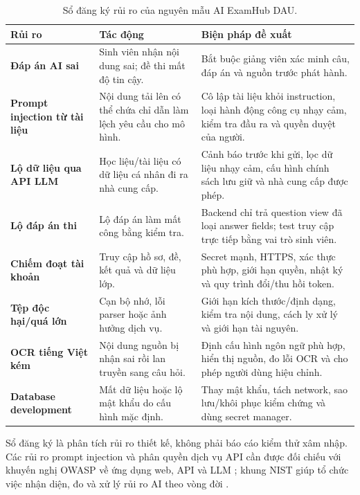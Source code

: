 \begin{table}[H]
\centering
\caption{Sổ đăng ký rủi ro của nguyên mẫu AI ExamHub DAU.}
\label{tab:risk-register}
\begin{tabularx}{\textwidth}{>{\bfseries\color{daumaroon}}p{}X X}
\toprule
\rowcolor{gray100}Rủi ro & Tác động & Biện pháp đề xuất \\
\midrule
Đáp án AI sai & Sinh viên nhận nội dung sai; đề thi mất độ tin cậy. & Bắt buộc giảng viên xác minh câu, đáp án và nguồn trước phát hành. \\
Prompt injection từ tài liệu & Nội dung tải lên có thể chứa chỉ dẫn làm lệch yêu cầu cho mô hình. & Cô lập tài liệu khỏi instruction, loại hành động công cụ nhạy cảm, kiểm tra đầu ra và quyền duyệt của người. \\
Lộ dữ liệu qua API LLM & Học liệu/tài liệu có dữ liệu cá nhân đi ra nhà cung cấp. & Cảnh báo trước khi gửi, lọc dữ liệu nhạy cảm, cấu hình chính sách lưu giữ và nhà cung cấp được phép. \\
Lộ đáp án thi & Lộ đáp án làm mất công bằng kiểm tra. & Backend chỉ trả question view đã loại answer fields; test truy cập trực tiếp bằng vai trò sinh viên. \\
Chiếm đoạt tài khoản & Truy cập hồ sơ, đề, kết quả và dữ liệu lớp. & Secret mạnh, HTTPS, xác thực phù hợp, giới hạn quyền, nhật ký và quy trình đổi/thu hồi token. \\
Tệp độc hại/quá lớn & Cạn bộ nhớ, lỗi parser hoặc ảnh hưởng dịch vụ. & Giới hạn kích thước/định dạng, kiểm tra nội dung, cách ly xử lý và giới hạn tài nguyên. \\
OCR tiếng Việt kém & Nội dung nguồn bị nhận sai rồi lan truyền sang câu hỏi. & Định cấu hình ngôn ngữ phù hợp, hiển thị nguồn, đo lỗi OCR và cho phép người dùng hiệu chỉnh. \\
Database development & Mất dữ liệu hoặc lộ mật khẩu do cấu hình mặc định. & Thay mật khẩu, tách network, sao lưu/khôi phục kiểm chứng và dùng secret manager. \\
\bottomrule
\end{tabularx}
\end{table}

Sổ đăng ký là phân tích rủi ro thiết kế, không phải báo cáo kiểm thử xâm
nhập. Các rủi ro prompt injection và phân quyền dịch vụ API cần được đối
chiếu với khuyến nghị OWASP về ứng dụng web, API và LLM
\cite{OWASPTop10,OWASPAPI,OWASPLLM}; khung NIST giúp tổ chức việc nhận
diện, đo và xử lý rủi ro AI theo vòng đời \cite{NISTAIRMF}.

